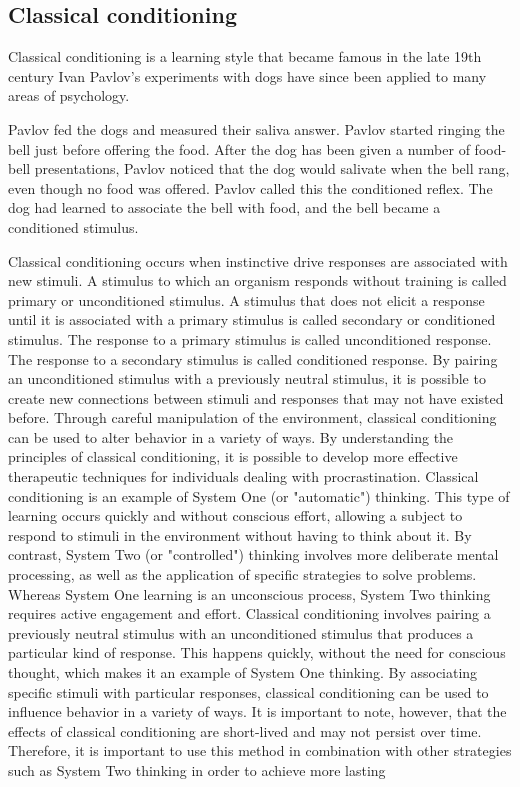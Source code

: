 \subsection{Classical conditioning}

Classical conditioning is a learning style that became famous in the late 19th century
Ivan Pavlov's experiments with dogs have since been applied to many areas of
psychology.

Pavlov fed the dogs and measured their saliva
answer. Pavlov started ringing the bell just before offering the food.
After the dog has been given a  number of food-bell presentations,
Pavlov noticed that the dog would salivate when the bell rang, even
though no food was offered. Pavlov called this the conditioned reflex.
The dog had learned to associate the bell with food, and the bell
became a conditioned stimulus.


Classical conditioning occurs when instinctive drive responses are associated
with new stimuli.
A stimulus to which an organism responds without training is called
primary or unconditioned stimulus. A stimulus that does not elicit a
response until it is associated with a primary stimulus is called
secondary or conditioned stimulus. The response to a primary stimulus
is called unconditioned response. The response to a secondary stimulus
is called conditioned response.
By pairing an unconditioned stimulus with a previously neutral stimulus, it is possible to create new connections
between stimuli and responses that may not have existed before. Through careful manipulation of the environment,
classical conditioning can be used to alter behavior in a variety of ways.
By understanding the principles of classical conditioning, it is possible to develop more effective therapeutic techniques for individuals dealing with procrastination.\cite{Rehman2022Aug}
Classical conditioning is an example of System One (or "automatic") thinking.
This type of learning occurs quickly and without conscious effort,
allowing a subject to respond to stimuli in the environment without having to think about it.
By contrast, System Two (or "controlled") thinking involves more deliberate mental processing, as well as the application of specific strategies to solve problems. Whereas System One learning is an unconscious process, System Two thinking requires active engagement and effort. Classical conditioning involves pairing a previously neutral stimulus with an unconditioned stimulus that produces a particular kind of response. This happens quickly, without the need for conscious thought, which makes it an example of System One thinking. By associating specific stimuli with particular responses, classical conditioning can be used to influence behavior in a variety of ways.  It is important to note, however, that the effects of classical conditioning are short-lived and may not persist over time. Therefore, it is important to use this method in combination with other strategies such as System Two thinking in order to achieve more lasting

